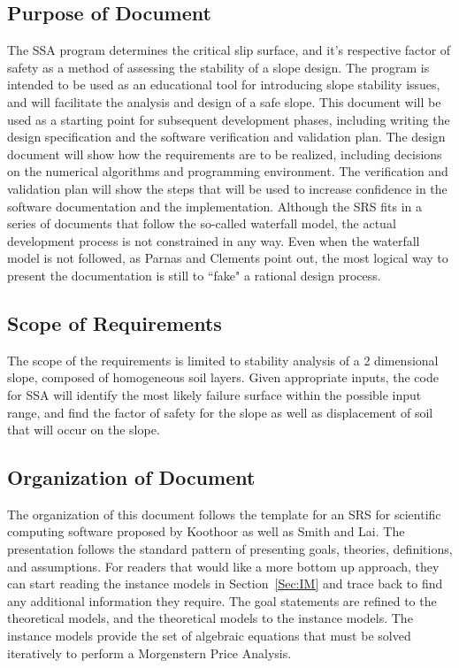 \documentclass[12pt]{article}
\begin{document}
\subsection{Purpose of Document}
\label{Sec:PoD}
The SSA program determines the critical slip surface, and it's respective factor of safety as a method of assessing the stability of a slope design. The program is intended to be used as an educational tool for introducing slope stability issues, and will facilitate the analysis and design of a safe slope.
This document will be used as a starting point for subsequent development phases, including writing the design specification and the software verification and validation plan. The design document will show how the requirements are to be realized, including decisions on the numerical algorithms and programming environment. The verification and validation plan will show the steps that will be used to increase confidence in the software documentation and the implementation. Although the SRS fits in a series of documents that follow the so-called waterfall model, the actual development process is not constrained in any way. Even when the waterfall model is not followed, as Parnas and Clements point out, the most logical way to present the documentation is still to ``fake" a rational design process.
\subsection{Scope of Requirements}
\label{Sec:SoR}
The scope of the requirements is limited to stability analysis of a 2 dimensional slope, composed of homogeneous soil layers. Given appropriate inputs, the code for SSA will identify the most likely failure surface within the possible input range, and find the factor of safety for the slope as well as displacement of soil that will occur on the slope.
\subsection{Organization of Document}
\label{Sec:OoD}
The organization of this document follows the template for an SRS for scientific computing software proposed by Koothoor as well as Smith and Lai. The presentation follows the standard pattern of presenting goals, theories, definitions, and assumptions. For readers that would like a more bottom up approach, they can start reading the instance models in Section~\ref{Sec:IM} and trace back to find any additional information they require.
The goal statements are refined to the theoretical models, and the theoretical models to the instance models. The instance models provide the set of algebraic equations that must be solved iteratively to perform a Morgenstern Price Analysis.
\end{document}
